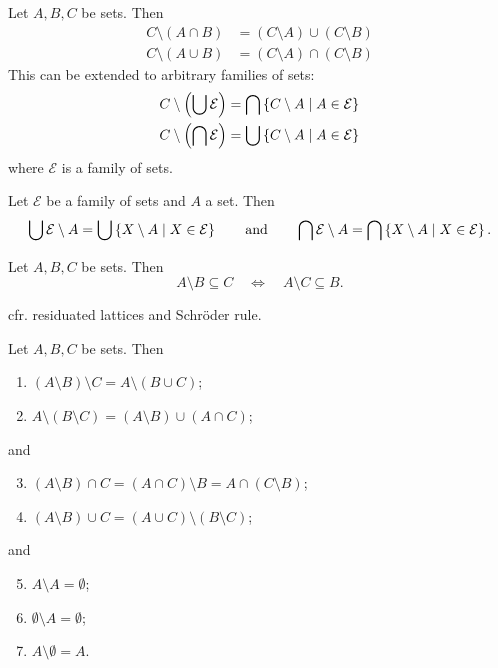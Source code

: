 \begin{proposition}
Let $A,B,C$ be sets. Then
\begin{align*}
C\setminus (A\cap B) &= (C\setminus A)\cup(C\setminus B) \\
C\setminus (A\cup B) &= (C\setminus A)\cap(C\setminus B)
\end{align*}
This can be extended to arbitrary families of sets:
\begin{align*}
C\setminus\left(\bigcup \mathcal{E}\right) &= \bigcap\left\{ C\setminus A \;\middle|\; A\in\mathcal{E} \right\} \\
C\setminus\left(\bigcap \mathcal{E}\right) &= \bigcup\left\{ C\setminus A \;\middle|\; A\in\mathcal{E} \right\}
\end{align*}
where $\mathcal{E}$ is a family of sets.
\end{proposition}
\begin{lemma}
Let $\mathcal{E}$ be a family of sets and $A$ a set. Then
\[ \bigcup \mathcal{E} \setminus A = \bigcup\left\{ X\setminus A \;\middle|\; X\in\mathcal{E} \right\} \qquad\text{and}\qquad \bigcap \mathcal{E} \setminus A = \bigcap\left\{ X\setminus A \;\middle|\; X\in\mathcal{E} \right\}. \]
\end{lemma}

\begin{proposition} \label{residuationSetBooleanLattice}
Let $A,B,C$ be sets. Then
\[ A\setminus B \subseteq C \quad\iff\quad A\setminus C\subseteq B. \]
\end{proposition}
cfr. residuated lattices and Schröder rule.


\begin{lemma} \label{differenceProperties}
Let $A,B,C$ be sets. Then
\begin{enumerate}
\item $(A\setminus B)\setminus C = A\setminus (B\cup C)$;
\item $A\setminus (B\setminus C) = (A\setminus B) \cup (A\cap C)$;
\end{enumerate}
and
\begin{enumerate} \setcounter{enumi}{2}
\item $(A\setminus B)\cap C = (A\cap C)\setminus B = A\cap (C\setminus B)$;
\item $(A\setminus B)\cup C = (A\cup C)\setminus (B\setminus C)$;
\end{enumerate}
and
\begin{enumerate} \setcounter{enumi}{4}
\item $A\setminus A = \emptyset$;
\item $\emptyset\setminus A = \emptyset$;
\item $A\setminus \emptyset = A$.
\end{enumerate}
\end{lemma}

